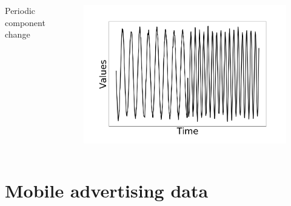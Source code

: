 \documentclass[intlimits, 9pt, unicode]{beamer}
\begin{document}
\begin{frame}
\begin{columns}
\begin{column}{0.5\textwidth}
  \begin{columns}
      \begin{column}{0.3\textwidth}
      \centering
      Periodic component change
      \end{column}
      \begin{column}{0.5\textwidth}
      \begin{figure}
		\includegraphics[scale=0.08]{images/examples_periodic}
	\end{figure}
	\end{column}
     \end{columns}

	\end{column}
	
     \end{columns}

\end{frame}


\section{Mobile advertising data}
\end{document}
